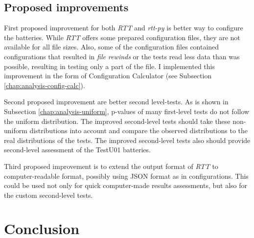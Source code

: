 \documentclass[
  digital,     %
  oneside,     %
  nosansbold,  %
  nocolorbold, %
  nolof,         %
  nolot,         %
]{fithesis4}
\begin{document}
\section{Proposed improvements}
First proposed improvement for both \emph{RTT} and \emph{rtt-py} is better way to configure the batteries. While \emph{RTT} offers some prepared configuration files, they are not available for all file sizes. Also, some of the configuration files contained configurations that resulted in \emph{file rewinds} or the tests read less data than was possible, resulting in testing only a part of the file. I implemented this improvement in the form of Configuration Calculator (see Subsection \ref{chap:analysis-config-calc}).

Second proposed improvement are better second level-tests. As is shown in Subsection \ref{chap:analysis-uniform}, p-values of many first-level tests do not follow the uniform distribution. The improved second-level tests should take these non-uniform distributions into account and compare the observed distributions to the real distributions of the tests. The improved second-level tests also should provide second-level assessment of the TestU01 batteries.

Third proposed improvement is to extend the output format of \emph{RTT} to computer-readable format, possibly using JSON format as in configurations. This could be used not only for quick computer-made results assessments, but also for the custom second-level tests.


\chapter{Conclusion}


\end{document}
